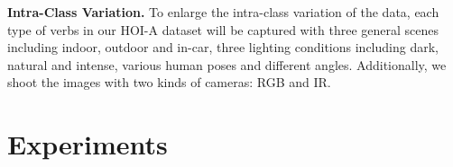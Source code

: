 \documentclass[10pt,twocolumn,letterpaper]{article}
\begin{document}
\noindent\textbf{Intra-Class Variation.} To enlarge the intra-class variation of the data, each type of verbs in our HOI-A dataset will be captured with three general scenes including indoor, outdoor and in-car, three lighting conditions including dark, natural and intense, various human poses and different angles. Additionally, we shoot the images with two kinds of cameras: RGB and IR.

 
\section{Experiments}
\begin{table*}[htb!]
  \vspace{-2mm}
  \begin{center}
  
  \small


\end{center}
\end{table*}
\end{document}
